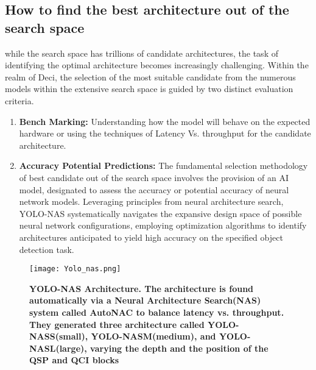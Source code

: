 \subsection{How to find the best architecture out of the search space}
while the search space has trillions of candidate architectures, the task of identifying the optimal architecture becomes increasingly challenging. Within the realm of Deci, the selection of the most suitable candidate from the numerous models within the extensive search space is guided by two distinct evaluation criteria. \cite{yolo-nas-webinar}
\begin{enumerate}
    \item \textbf{Bench Marking: } Understanding how the model will behave on the expected hardware or using the techniques of Latency Vs. throughput for the candidate architecture. \\
    \item \textbf{Accuracy Potential Predictions: } The fundamental selection methodology of best candidate out of the search space involves the provision of an AI model, designated to assess the accuracy or potential accuracy of neural network models. Leveraging principles from neural architecture search, YOLO-NAS systematically navigates the expansive design space of possible neural network configurations, employing optimization algorithms to identify architectures anticipated to yield high accuracy on the specified object detection task.
\end{enumerate}
 \begin{figure}[H]
     \centering
     \texttt{[image: Yolo\_nas.png]}
     \caption{\textbf{YOLO-NAS Architecture. The architecture is found automatically via a Neural Architecture Search(NAS) system called AutoNAC to balance latency vs. throughput. They generated three architecture called YOLO-NASS(small), YOLO-NASM(medium), and YOLO-NASL(large), varying the depth and the position of the QSP and QCI blocks \cite{YOLO-NAS}}}
     \label{fig:YOLO-NAS Architecture.}
\end{figure}


